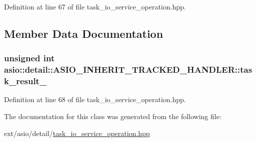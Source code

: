 Definition at line 67 of file task\+\_\+io\+\_\+service\+\_\+operation.\+hpp.



\subsection{Member Data Documentation}
\hypertarget{classasio_1_1detail_1_1_a_s_i_o___i_n_h_e_r_i_t___t_r_a_c_k_e_d___h_a_n_d_l_e_r_ace541f4b74231dfbec980267b7639108}{}
\subsubsection[{task\+\_\+result\+\_\+}]{\setlength{\rightskip}{0pt plus 5cm}unsigned int asio\+::detail\+::\+A\+S\+I\+O\+\_\+\+I\+N\+H\+E\+R\+I\+T\+\_\+\+T\+R\+A\+C\+K\+E\+D\+\_\+\+H\+A\+N\+D\+L\+E\+R\+::task\+\_\+result\+\_\+\hspace{0.3cm}{\ttfamily [protected]}}\label{classasio_1_1detail_1_1_a_s_i_o___i_n_h_e_r_i_t___t_r_a_c_k_e_d___h_a_n_d_l_e_r_ace541f4b74231dfbec980267b7639108}


Definition at line 68 of file task\+\_\+io\+\_\+service\+\_\+operation.\+hpp.



The documentation for this class was generated from the following file\+:\begin{DoxyCompactItemize}
\item 
ext/asio/detail/\hyperlink{task__io__service__operation_8hpp}{task\+\_\+io\+\_\+service\+\_\+operation.\+hpp}\end{DoxyCompactItemize}
